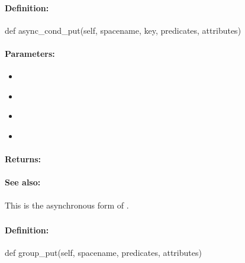 \paragraph{Definition:}
\begin{pythoncode}
def async_cond_put(self, spacename, key, predicates, attributes)
\end{pythoncode}

\paragraph{Parameters:}
\begin{itemize}[noitemsep]
\item {}\\

\item {}\\

\item {}\\

\item {}\\

\end{itemize}

\paragraph{Returns:}


\paragraph{See also:}  This is the asynchronous form of .

\pagebreak
\subsubsection{}
\label{api:python:group_put}


\paragraph{Definition:}
\begin{pythoncode}
def group_put(self, spacename, predicates, attributes)
\end{pythoncode}

